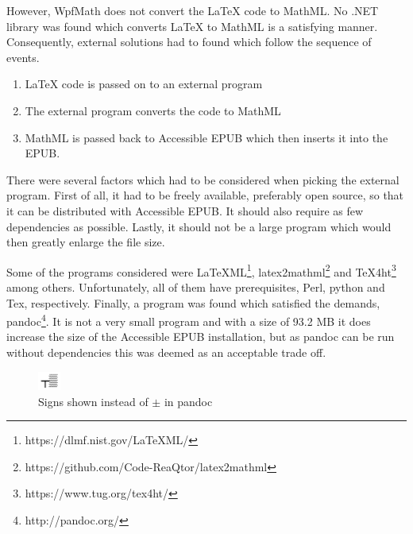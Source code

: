 However, WpfMath does not convert the LaTeX code to MathML. No .NET library was found which converts LaTeX to MathML is a satisfying manner. Consequently, external solutions had to found which follow the sequence of events.

\begin{enumerate}
	\item LaTeX code is passed on to an external program
	\item The external program converts the code to MathML
	\item MathML is passed back to Accessible EPUB which then inserts it into the EPUB.
\end{enumerate}

There were several factors which had to be considered when picking the external program. First of all, it had to be freely available, preferably open source, so that it can be distributed with Accessible EPUB. It should also require as few dependencies as possible. Lastly, it should not be a large program which would then greatly enlarge the file size. 

Some of the programs considered were LaTeXML\footnote{https://dlmf.nist.gov/LaTeXML/}, latex2mathml\footnote{https://github.com/Code-ReaQtor/latex2mathml} and TeX4ht\footnote{https://www.tug.org/tex4ht/} among others. Unfortunately, all of them have prerequisites, Perl, python and Tex, respectively. Finally, a program was found which satisfied the demands, pandoc\footnote{http://pandoc.org/}. It is not a very small program and with a size of 93.2 MB it does increase the size of the Accessible EPUB installation, but as pandoc can be run without dependencies this was deemed as an acceptable trade off.



\begin{figure}[h]
	\centering
	\includegraphics[width=2em]{figures/pandocSigns.png}
	\caption{Signs shown instead of $\pm$ in pandoc}
	\label{fig:signsPlusMinus}
\end{figure}

